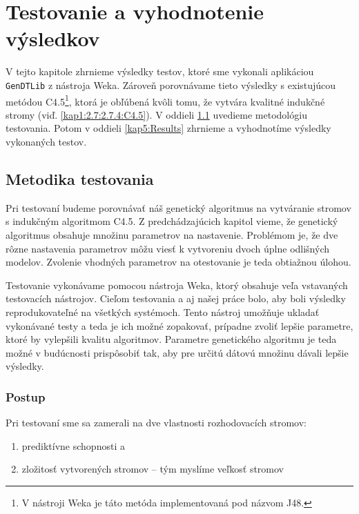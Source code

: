 \chapter{Testovanie a vyhodnotenie výsledkov}
V tejto kapitole zhrnieme výsledky testov, ktoré sme vykonali aplikáciou \verb|GenDTLib| z nástroja Weka. Zároveň porovnávame tieto výsledky s existujúcou metódou C4.5\footnote{V nástroji Weka je táto metóda implementovaná pod názvom J48.}, ktorá je obľúbená kvôli tomu, že vytvára kvalitné indukčné stromy (viď. \ref{kap1:2.7:2.7.4:C4.5}). V oddieli \ref{kap5:Methodology} uvedieme metodológiu testovania. Potom v oddieli \ref{kap5:Results} zhrnieme a vyhodnotíme výsledky vykonaných testov.
\section{Metodika testovania}\label{kap5:Methodology}
Pri testovaní budeme porovnávať náš genetický algoritmus na vytváranie stromov s indukčným algoritmom C4.5. Z predchádzajúcich kapitol vieme, že genetický algoritmus obsahuje množinu parametrov na nastavenie. Problémom je, že dve rôzne nastavenia parametrov môžu viesť k vytvoreniu dvoch úplne odlišných modelov.
Zvolenie vhodných parametrov na otestovanie je teda obtiažnou úlohou.

Testovanie vykonávame pomocou nástroja Weka, ktorý obsahuje veľa vstavaných testovacích nástrojov. Cieľom testovania a aj našej práce bolo, aby boli výsledky reprodukovateľné na všetkých systémoch. Tento nástroj umožňuje ukladať vykonávané testy a teda je ich možné zopakovať, prípadne zvoliť lepšie parametre, ktoré by vylepšili kvalitu algoritmov. Parametre genetického algoritmu je teda možné v budúcnosti prispôsobiť tak, aby pre určitú dátovú množinu dávali lepšie výsledky.

\subsection{Postup}
Pri testovaní sme sa zamerali na dve vlastnosti rozhodovacích stromov:
\begin{enumerate}
\item prediktívne schopnosti a
\item zložitosť vytvorených stromov -- tým myslíme veľkosť stromov
\end{enumerate}

